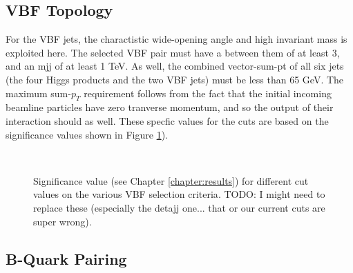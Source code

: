     \subsection{VBF Topology}

        For the VBF jets, the charactistic wide-opening angle and high invariant mass is exploited here.
        The selected VBF pair must have a \deta between them of at least 3,
            and an mjj of at least 1 TeV.
        As well, the combined vector-sum-pt of all six jets
            (the four Higgs products and the two VBF jets)
            must be less than 65 GeV.
        The maximum sum-$p_T$ requirement follows from the fact that the initial incoming beamline particles have
            zero tranverse momentum, and so the output of their interaction should as well.
        These specfic values for the cuts are based on the significance values shown in Figure \ref{fig:vbf_cuts}).

        \begin{figure}[tbh]
            \\
            \caption{
                Significance value (see Chapter \ref{chapter:results})
                    for different cut values on the various VBF selection criteria\cite{vbf_hh_4b_2018_int}.
                TODO: I might need to replace these (especially the detajj one... that or our current cuts are super wrong).
            }
            \label{fig:vbf_cuts}
        \end{figure}
        \FloatBarrier


    \subsection{B-Quark Pairing}

